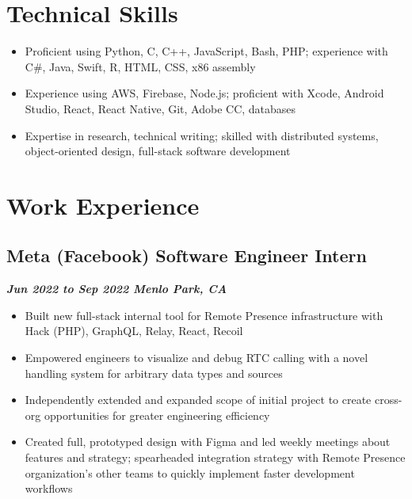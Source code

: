 \documentclass[10pt]{article}
\begin{document}
\begin{raggedright}
    \section*{Technical Skills}

        \begin{itemize}
            \item Proficient using Python, C, C++, JavaScript, Bash, PHP; experience with C\#, Java, Swift, R, HTML, CSS, x86 assembly
            \item Experience using AWS, Firebase, Node.js; proficient with Xcode, Android Studio, React, React Native, Git, Adobe CC, databases
            \item Expertise in research, technical writing; skilled with distributed systems, object-oriented design, full-stack software development
        \end{itemize}

    \section*{Work Experience}

	    \subsection*{\textbf{\large{Meta (Facebook) \textendash{} Software Engineer Intern}}} \hfill \textbf{\textit{Jun 2022 to Sep 2022 \textendash{} Menlo Park, CA}}
        \begin{itemize}
            \item Built new full-stack internal tool for Remote Presence infrastructure with Hack (PHP), GraphQL, Relay, React, Recoil
            \item Empowered engineers to visualize and debug RTC calling with a novel handling system for arbitrary data types and sources
            \item Independently extended and expanded scope of initial project to create cross-org opportunities for greater engineering efficiency
            \item Created full, prototyped design with Figma and led weekly meetings about features and strategy; spearheaded integration strategy with Remote Presence organization's other teams to quickly implement faster development workflows
        \end{itemize}


\end{raggedright}
\end{document}
